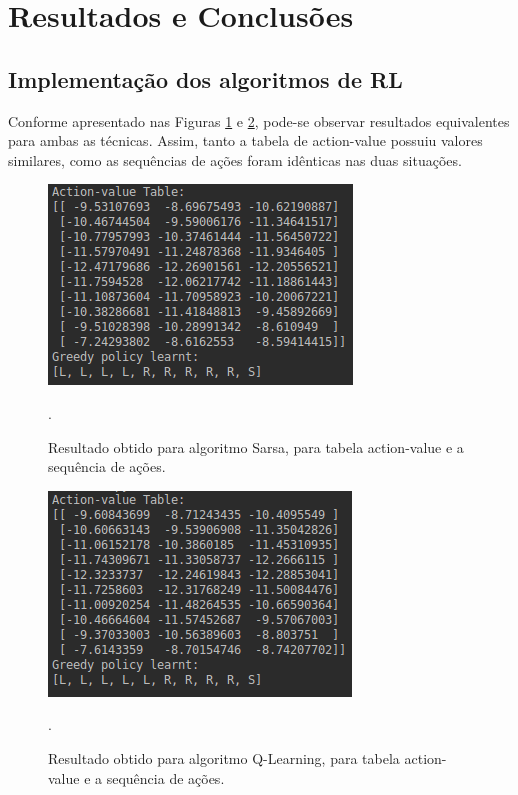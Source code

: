 \documentclass[conference]{IEEEtran}
\begin{document}
\section{Resultados e Conclusões}

\subsection{Implementação dos algoritmos de RL}

Conforme apresentado nas Figuras \ref{sarsa_test_rl} e \ref{qlearning_test_rl}, pode-se observar resultados equivalentes para ambas as técnicas. Assim, tanto a tabela de action-value possuiu valores similares, como as sequências de ações foram idênticas nas duas situações.

\begin{figure}[htbp]
\centering
\centerline{\includegraphics[scale=0.5]{imagens/sarsa_test_rl.png}}
\caption{Resultado obtido para algoritmo Sarsa, para tabela action-value e a sequência de ações.}.
\label{sarsa_test_rl}
\end{figure}

\begin{figure}[htbp]
\centering
\centerline{\includegraphics[scale=0.5]{imagens/qlearning_test_rl.png}}
\caption{Resultado obtido para algoritmo Q-Learning, para tabela action-value e a sequência de ações.}.
\label{qlearning_test_rl}
\end{figure} 
\end{document}
